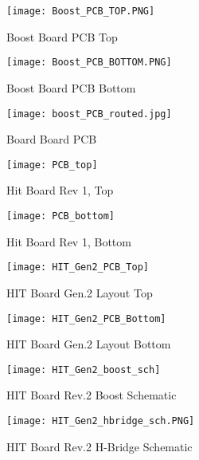 \begin{figure}[ht]
\centering
\texttt{[image: Boost\_PCB\_TOP.PNG]}
\caption{Boost Board PCB Top}
\label{boostPCBTop}
\end{figure}

\begin{figure}[hb]
\centering
\texttt{[image: Boost\_PCB\_BOTTOM.PNG]}
\caption{Boost Board PCB Bottom}
\label{boostPCBBottom}
\end{figure}

\begin{figure}[ht]
\centering
\texttt{[image: boost\_PCB\_routed.jpg]}
\caption{Board Board PCB}
\label{unpopulatedBoostPCB}
\end{figure}

\begin{figure}[hb]
\centering
\texttt{[image: PCB\_top]}
\caption{Hit Board Rev 1, Top}
\label{PCB Top}
\end{figure}

\begin{figure}[ht]
\centering
\texttt{[image: PCB\_bottom]}
\caption{Hit Board Rev 1, Bottom}
\label{PCB Bottom}
\end{figure}

\begin{figure}[hb]
\centering
\texttt{[image: HIT\_Gen2\_PCB\_Top]}
\caption{HIT Board Gen.2 Layout Top}
\label{HIT Board Rev 2, Top}
\end{figure}

\clearpage

\begin{figure}[ht]
\centering
\texttt{[image: HIT\_Gen2\_PCB\_Bottom]}
\caption{HIT Board Gen.2 Layout Bottom}
\label{HIT Board Rev 2, Bottom}
\end{figure}

\begin{figure}[hb]
\centering
\texttt{[image: HIT\_Gen2\_boost\_sch]}
\caption{HIT Board Rev.2 Boost Schematic}
\label{Rev2 boost sch}
\end{figure}


\begin{figure}[ht]
\centering
\texttt{[image: HIT\_Gen2\_hbridge\_sch.PNG]}
\caption{HIT Board Rev.2 H-Bridge Schematic}
\label{Rev2 hbridge sch}
\end{figure}

